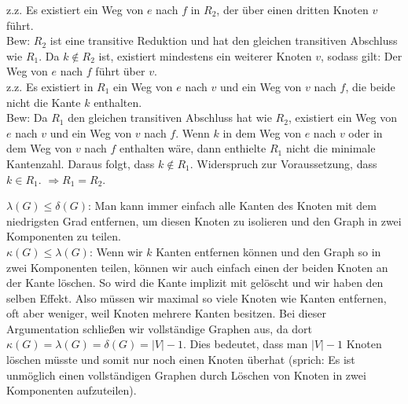 \documentclass[11pt]{scrartcl} %
\begin{document}
\begin{compactenum}[(a)]
z.z. Es existiert ein Weg von $e$ nach $f$ in $R_2$, der über einen dritten Knoten $v$ führt.\\
Bew: $R_2$ ist eine transitive Reduktion und hat den gleichen transitiven Abschluss wie $R_1$. Da $k \notin R_2$ ist, existiert mindestens ein weiterer Knoten $v$, sodass gilt: Der Weg von $e$ nach $f$ führt über $v$.\\
z.z. Es existiert in $R_1$ ein Weg von $e$ nach $v$ und ein Weg von $v$ nach $f$, die beide nicht die Kante $k$ enthalten.
\\
Bew: Da $R_1$ den gleichen transitiven Abschluss hat wie $R_2$, existiert ein Weg von $e$ nach $v$ und ein Weg von $v$ nach $f$. Wenn $k$ in dem Weg von $e$ nach $v$ oder in dem Weg von $v$ nach $f$ enthalten wäre, dann enthielte $R_1$ nicht die minimale Kantenzahl. Daraus folgt, dass $k \notin R_1$. Widerspruch zur Voraussetzung, dass $k \in R_1$. $\Rightarrow R_1 = R_2$.
\\
\item $\lambda(G) \le \delta(G)$: Man kann immer einfach alle Kanten des Knoten mit dem niedrigsten Grad entfernen, um diesen Knoten zu isolieren und den Graph in zwei Komponenten zu teilen.\\
$\kappa(G) \le \lambda(G)$: Wenn wir $k$ Kanten entfernen können und den Graph so in zwei Komponenten teilen, können wir auch einfach einen der beiden Knoten an der Kante löschen. So wird die Kante implizit mit gelöscht und wir haben den selben Effekt. Also müssen wir maximal so viele Knoten wie Kanten entfernen, oft aber weniger, weil Knoten mehrere Kanten besitzen. Bei dieser Argumentation schließen wir vollständige Graphen aus, da dort $\kappa(G)=\lambda(G)=\delta(G)=|V|-1$. Dies bedeutet, dass man $|V|-1$ Knoten löschen müsste und somit nur noch einen Knoten überhat (sprich: Es ist unmöglich einen vollständigen Graphen durch Löschen von Knoten in zwei Komponenten aufzuteilen).

\end{compactenum}
\end{document}
